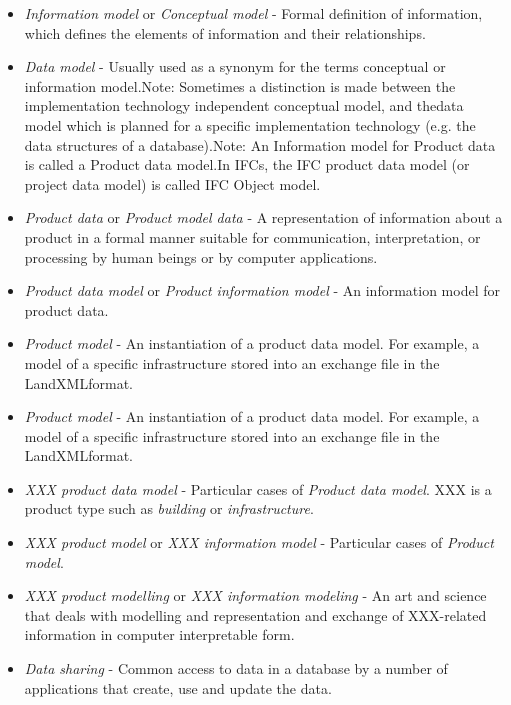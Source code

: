 \begin{itemize}
    \item \emph{In\-for\-ma\-tion mod\-el} or \emph{Con\-cep\-tu\-al mod\-el} - Formal definition of information, which defines the elements of information and their relationships.
    \item \emph{Da\-ta mod\-el} - Usually used as a synonym for the terms conceptual or information model.Note: Sometimes a distinction is made between the implementation technology independent conceptual model, and thedata model which is planned for a specific implementation technology (e.g. the data structures of a database).Note: An Information model for Product data is called a Product data model.In IFCs, the IFC product data model (or project data model) is called IFC Object model.
    
    
    \item \emph{Prod\-uct da\-ta} or \emph{Prod\-uct mod\-el da\-ta} - A representation of information about a product in a formal manner suitable for communication, interpretation, or processing by human beings or by computer applications.
    \item \emph{Prod\-uct da\-ta mod\-el} or \emph{Prod\-uct in\-for\-ma\-tion mod\-el} - An information model for product data.
    \item \emph{Prod\-uct mod\-el} - An instantiation of a product data model. For example, a model of a specific infrastructure stored into an exchange file in the LandXMLformat.
    \item \emph{Prod\-uct mod\-el} - An instantiation of a product data model. For example, a model of a specific infrastructure stored into an exchange file in the LandXMLformat.
    \item \emph{XXX prod\-uct da\-ta mod\-el} - Particular cases of \emph{Prod\-uct da\-ta mod\-el}. XXX is a product type such as  \emph{build\-ing} or \emph{in\-fra\-struc\-ture}.
    \item \emph{XXX prod\-uct mod\-el} or \emph{XXX information model} - Particular cases of \emph{Prod\-uct mod\-el}.
    \item \emph{XXX product mod\-el\-ling} or \emph{XXX information modeling} - An art and science that deals with modelling and representation and exchange of XXX-related information in computer interpretable form.
    \item \emph{Data sharing} - Common access to data in a database by a number of applications that create, use and update the data.

\end{itemize}
